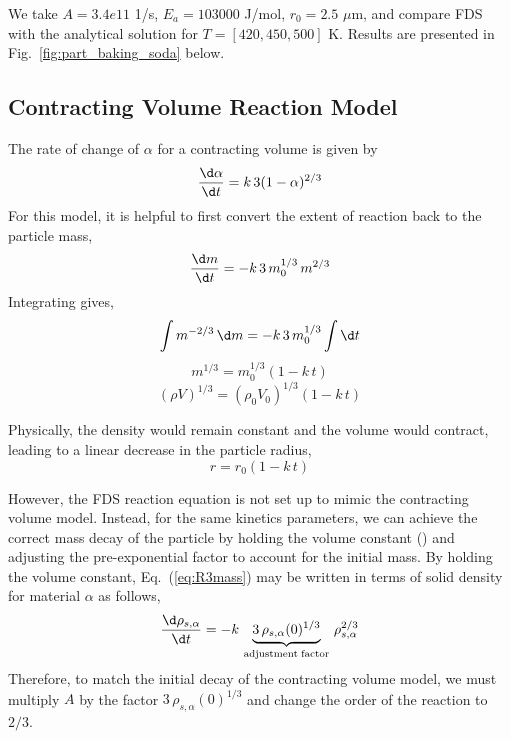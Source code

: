 \documentclass[11pt]{book}
\begin{document}
We take $A = 3.4e11$ 1/s, $E_a = 103000$ J/mol, $r_0 = 2.5$ $\mu$m, and compare FDS with the analytical solution for $T=[420, 450, 500]$ K.  Results are presented in Fig.~\ref{fig:part_baking_soda} below.

\subsection*{Contracting Volume Reaction Model}

The rate of change of $\alpha$ for a contracting volume is given by \cite{Khawam:2006}
\begin{equation}
\frac{\d \alpha}{\d t} = k \, 3(1-\alpha)^{2/3}
\end{equation}
For this model, it is helpful to first convert the extent of reaction back to the particle mass,
\begin{equation}
\label{eq:R3mass}
\frac{\d m}{\d t} = - k \, 3 \, m_0^{1/3} \, m^{2/3}
\end{equation}
Integrating gives,
\begin{equation}
\int m^{-2/3} \,\d m = -k \, 3 \, m_0^{1/3} \int \d t
\end{equation}
\begin{equation}
m^{1/3} = m_0^{1/3} (1-k \, t)
\end{equation}
\begin{equation}
(\rho V)^{1/3} = (\rho_0 V_0)^{1/3} (1-k \, t)
\end{equation}

Physically, the density would remain constant and the volume would contract, leading to a linear decrease in the particle radius,
\begin{equation}
r = r_0 (1-k \, t)
\end{equation}

However, the FDS reaction equation is not set up to mimic the contracting volume model.  Instead, for the same kinetics parameters, we can achieve the correct mass decay of the particle by holding the volume constant () and adjusting the pre-exponential factor to account for the initial mass.  By holding the volume constant, Eq.~(\ref{eq:R3mass}) may be written in terms of solid density for material $\alpha$ as follows,
\begin{equation}
\label{eq:R3rho}
\frac{\d \rho_{s,\alpha}}{\d t} = - k \, \underbrace{3 \, \rho_{s,\alpha}(0)^{1/3}}_{\mathrm{adjustment \; factor}} \, \rho_{s,\alpha}^{2/3}
\end{equation}
Therefore, to match the initial decay of the contracting volume model, we must multiply $A$ by the factor $3 \, \rho_{s,\alpha}(0)^{1/3}$ and change the order of the reaction to $2/3$.
\end{document}

